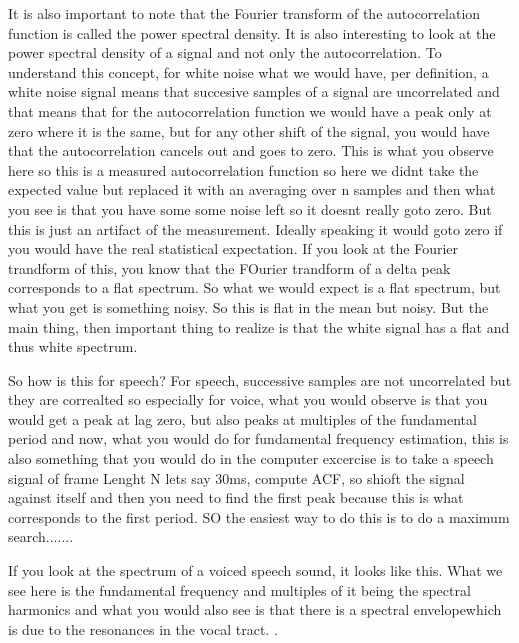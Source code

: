 It is also important to note that the Fourier transform of the autocorrelation function is called the power spectral density.  It is also interesting to look at the power spectral density of a signal and not only the autocorrelation. To understand this concept, for white noise what we would have, per definition, a white noise signal means that succesive samples of a signal are uncorrelated and that means that for the autocorrelation function we would have a peak only at zero where it is the same, but for any other shift of the signal, you would have that the autocorrelation cancels out and goes to zero. This is what you observe here so this is a measured autocorrelation function so here we didnt take the expected value but replaced it with an averaging over n samples and then what you see is that you have some some noise left so it doesnt really goto zero. But this is just an artifact of the measurement. Ideally speaking it would goto zero if you would have the real statistical expectation. If you look at the Fourier trandform of this, you know that the FOurier trandform of a delta peak corresponds to a flat spectrum. So what we would expect is a flat spectrum, but what you get is something noisy. So this is flat in the mean but noisy. But the main thing, then important thing to realize is that the white signal has a flat and thus white spectrum.

So how is this for  speech? For speech, successive samples are not uncorrelated but they are correalted so especially for voice, what you would observe is that you would get a peak at lag zero, but also peaks at multiples of the fundamental period and now, what you would do for fundamental frequency estimation, this is also something that you would do in the computer excercise is to take a speech signal of frame Lenght N lets say 30ms, compute ACF, so shioft the signal against itself and then you need to find the first peak because this is what corresponds to the first period. SO the easiest way to do this is to do a maximum search.......

If you look at the spectrum of a voiced speech sound, it looks like this.  What we see here is the fundamental frequency and multiples of it being the spectral harmonics and what you would also see is that there is a spectral envelopewhich is due to the resonances in the vocal tract. .

